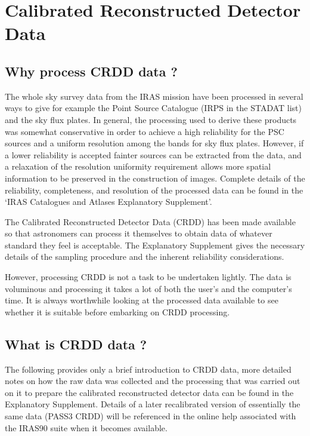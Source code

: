\documentclass[twoside,11pt]{starlink}
\begin{document}
\section{Calibrated Reconstructed Detector Data
\label{m:crdd}}

\subsection{Why process CRDD data ?}
The whole sky survey data from the IRAS mission have been processed in several
ways to give for example the Point Source Catalogue (IRPS in the STADAT list)
and the sky flux plates. In general, the processing used to derive these
products was somewhat conservative in order to achieve a high reliability for
the PSC sources and a uniform resolution among the bands for sky flux plates.
However, if a lower reliability is accepted fainter sources can be extracted
from the data, and a relaxation of the resolution uniformity requirement allows
more spatial information to be preserved in the construction of images.
Complete details of the reliability, completeness, and resolution of the
processed data can be found in the `IRAS Catalogues and Atlases Explanatory
Supplement'.

The Calibrated Reconstructed Detector Data (CRDD) has been made available so
that astronomers can process it themselves to obtain data of whatever standard
they feel is acceptable. The Explanatory Supplement gives the necessary details
of the sampling procedure and the inherent reliability considerations.

However, processing CRDD is not a task to be undertaken lightly. The data is
voluminous and processing it takes a lot of both the user's and the computer's
time. It is always worthwhile looking at the processed data available to see
whether it is suitable before embarking on CRDD processing.

\subsection{What is CRDD data ?}

The following provides only a brief introduction to CRDD data, more detailed
notes on how the raw data was collected and the processing that was carried out
on it to prepare the  calibrated reconstructed detector data can be found in
the Explanatory Supplement. Details of a later recalibrated version of
essentially the same data (PASS3 CRDD) will be referenced in the online help
associated with the IRAS90 suite when it becomes available.
\end{document}
